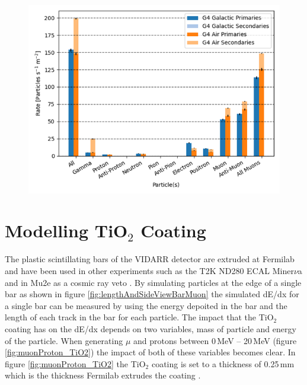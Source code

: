 \begin{figure}[!h]
 \centering
 \includegraphics[width=0.7\linewidth]{Chapter4/Figs/Raster/CryPlots/CRY_rates.png}
 \label{fig:CRY_rates}
\end{figure}

\clearpage
\section{Modelling TiO$_2$ Coating}
The plastic scintillating bars of the VIDARR detector are extruded at Fermilab and have been used in other experiments such as the T2K ND280 ECAL \cite{Allan_2013} Miner$\nu$a \cite{aliaga2014design} and in Mu2e as a cosmic ray veto \cite{Pla-Dalmau2014}. By simulating particles at the edge of a single bar as shown in figure \ref{fig:lengthAndSideViewBarMuon} the simulated dE/dx for a single bar can be measured by using the energy depoited in the bar and the length of each track in the bar for each particle. The impact that the TiO$_2$ coating has on the dE/dx depends on two variables, mass of particle and energy of the particle. When generating $\mu$ and protons between 0\,MeV -- 20\,MeV (figure \ref{fig:muonProton_TiO2}) the impact of both of these variables becomes clear. In figure \ref{fig:muonProton_TiO2} the TiO$_2$ coating is set to a thickness of 0.25\,mm which is the thickness Fermilab extrudes the coating \cite{Pla-Dalmau2014}.

